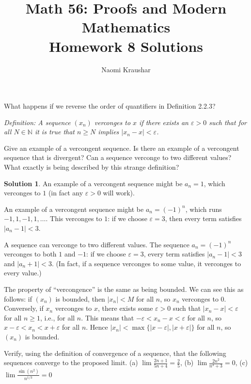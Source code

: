 \documentclass[12pt]{article}
\theoremstyle{definition}
\theoremstyle{definition}
\newtheorem*{soln}{Solution}
\newcommand{\N}{\mathbb{N}}
\begin{document}
\title{Math 56: Proofs and Modern Mathematics\\ Homework 8 Solutions}
\author{Naomi Kraushar}
\maketitle


\begin{prob}
What happens if we reverse the order of quantifiers in Definition 2.2.3?

\emph{Definition: A sequence $(x_n)$ verconges to $x$ if there exists an $\varepsilon>0$ such that for all $N\in\N$ it is true that $n\geq N$ implies $|x_n-x|<\varepsilon$.}

Give  an  example  of  a  vercongent  sequence. Is there an example of a vercongent sequence that is divergent? Can a sequence verconge to two different values? What exactly is being described by this strange definition?
\end{prob}

\begin{soln}
An example of a vercongent sequence might be $a_n=1$, which verconges to $1$ (in fact any $\varepsilon>0$ will work).

An example of a vercongent sequence might be $a_n=(-1)^n$, which runs $-1,1,-1,1,\dots$. This verconges to $1$: if we choose $\varepsilon=3$, then every term satisfies $|a_n-1|<3$.

A sequence can verconge to two different values. The sequence $a_n=(-1)^n$ verconges to both $1$ and $-1$: if we choose $\varepsilon=3$, every term satisfies $|a_n-1|<3$ and $|a_n+1|<3$. (In fact, if a sequence verconges to some value, it verconges to every value.)

The property of ``vercongence'' is the same as being bounded. We can see this as follows: if $(x_n)$ is bounded, then $|x_n|<M$ for all $n$, so $x_n$ verconges to $0$. Conversely, if $x_n$ verconges to $x$, there exists some $\varepsilon>0$ such that $|x_n-x|<\varepsilon$ for all $n\geq 1$, i.e., for all $n$. This means that $-\varepsilon<x_n-x<\varepsilon$ for all $n$, so $x-\varepsilon<x_n<x+\varepsilon$ for all $n$. Hence $|x_n|<\max\{|x-\varepsilon|,|x+\varepsilon|\}$ for all $n$, so $(x_n)$ is bounded.
\end{soln}

\begin{prob}
Verify, using the definition of convergence of a sequence, that the following sequences converge to the proposed limit. (a) $\lim\frac{2n+1}{5n+4}=\frac{2}{5}$, (b) $\lim\frac{2n^2}{n^3+3}=0$, (c) $\lim\frac{\sin(n^2)}{n^{1/3}}=0$
\end{prob}
\end{document}
